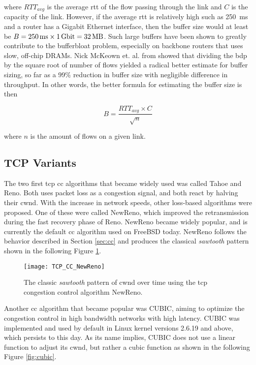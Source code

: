 where $RTT_{avg}$ is the average \gls{rtt} of the flow passing through the link and $C$ is the capacity of the link. However, if the average \gls{rtt} is relatively high such as \SI{250}{ms} and a router has a Gigabit Ethernet interface, then the buffer size would at least be $B = \SI{250}{\milli\second} \times \SI{1}{\giga\bit} = \SI{32}{\mega\byte}$. Such large buffers have been shown to greatly contribute to the bufferbloat problem, especially on backbone routers that uses slow, off-chip DRAMs. Nick McKeown et. al. from \cite{sizing_router_buffers} showed that dividing the \gls{bdp} by the square root of number of flows yielded a radical better estimate for buffer sizing, so far as a 99\% reduction in buffer size with negligible difference in throughput. In other words, the better formula for estimating the buffer size is then

\begin{equation}
    B = \frac{RTT_{avg} \times C}{\sqrt{n}}
\end{equation}

where $n$ is the amount of flows on a given link.




\subsection{TCP Variants}

The two first \gls{tcp} \gls{cc} algorithms that became widely used was called Tahoe and Reno. Both uses packet loss as a congestion signal, and both react by halving their \gls{cwnd}. With the increase in network speeds, other loss-based algorithms were proposed. One of these were called NewReno, which improved the retransmission during the fast recovery phase of Reno. NewReno became widely popular, and is currently the default \gls{cc} algorithm used on FreeBSD today. NewReno follows the behavior described in Section \ref{sec:cc} and produces the classical \textit{sawtooth} pattern shown in the following Figure \ref{fig:newreno}.

\begin{figure}[H]
    \centering
    \texttt{[image: TCP\_CC\_NewReno]}
    \captionsetup{width=0.5\linewidth}
    \caption{The classic \textit{sawtooth} pattern of \gls{cwnd} over time using the \gls{tcp} congestion control algorithm NewReno.}
    \label{fig:newreno}
\end{figure}

Another \gls{cc} algorithm that became popular was CUBIC, aiming to optimize the congestion control in high bandwidth networks with high latency. CUBIC was implemented and used by default in Linux kernel versions 2.6.19 and above, which persists to this day. As its name implies, CUBIC does not use a linear function to adjust its \gls{cwnd}, but rather a cubic function as shown in the following Figure \ref{fig:cubic}.

